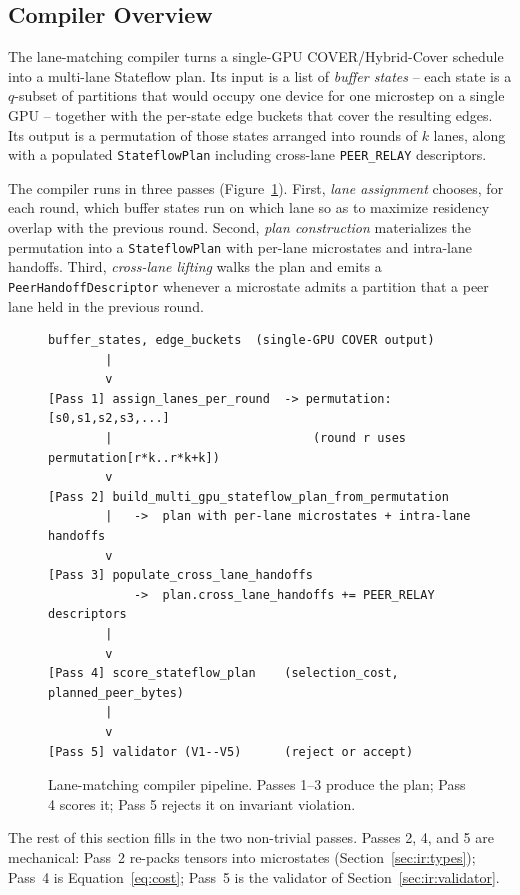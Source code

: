 
\subsection{Compiler Overview}\label{sec:compiler:overview}

The lane-matching compiler turns a single-GPU COVER/Hybrid-Cover
schedule into a multi-lane Stateflow plan. Its input is a list of
\emph{buffer states} -- each state is a $q$-subset of partitions that
would occupy one device for one microstep on a single GPU -- together
with the per-state edge buckets that cover the resulting edges. Its
output is a permutation of those states arranged into rounds of
$k$ lanes, along with a populated \texttt{StateflowPlan} including
cross-lane \texttt{PEER\_RELAY} descriptors.

The compiler runs in three passes (Figure~\ref{fig:compiler:pipeline}).
First, \emph{lane assignment} chooses, for each round, which buffer
states run on which lane so as to maximize residency overlap with the
previous round. Second, \emph{plan construction} materializes the
permutation into a \texttt{StateflowPlan} with per-lane microstates and
intra-lane handoffs. Third, \emph{cross-lane lifting} walks the plan
and emits a \texttt{PeerHandoffDescriptor} whenever a microstate
admits a partition that a peer lane held in the previous round.

\begin{figure}[t]
\centering
\begin{lstlisting}[basicstyle=\ttfamily\footnotesize]
buffer_states, edge_buckets  (single-GPU COVER output)
        |
        v
[Pass 1] assign_lanes_per_round  -> permutation: [s0,s1,s2,s3,...]
        |                            (round r uses permutation[r*k..r*k+k])
        v
[Pass 2] build_multi_gpu_stateflow_plan_from_permutation
        |   ->  plan with per-lane microstates + intra-lane handoffs
        v
[Pass 3] populate_cross_lane_handoffs
            ->  plan.cross_lane_handoffs += PEER_RELAY descriptors
        |
        v
[Pass 4] score_stateflow_plan    (selection_cost, planned_peer_bytes)
        |
        v
[Pass 5] validator (V1--V5)      (reject or accept)
\end{lstlisting}
\caption{Lane-matching compiler pipeline. Passes 1--3 produce the
plan; Pass 4 scores it; Pass 5 rejects it on invariant violation.}
\label{fig:compiler:pipeline}
\end{figure}

The rest of this section fills in the two non-trivial passes. Passes
2, 4, and 5 are mechanical: Pass~2 re-packs tensors into microstates
(Section~\ref{sec:ir:types}); Pass~4 is Equation~\ref{eq:cost}; Pass~5
is the validator of Section~\ref{sec:ir:validator}.

